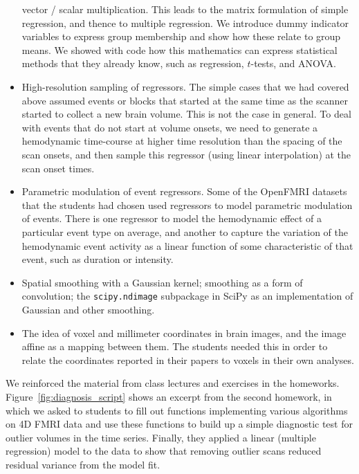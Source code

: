 \begin{itemize}
        vector / scalar multiplication.  This leads to the matrix formulation
        of simple regression, and thence to multiple regression.  We introduce
        dummy indicator variables to express group membership and show how
        these relate to group means.  We showed with code how this mathematics
        can express statistical methods that they already know, such as
        regression, $t$-tests, and ANOVA.
\item
    High-resolution sampling of regressors.  The simple cases that we had
        covered above assumed events or blocks that started at the same time
        as the scanner started to collect a new brain volume.  This is not the
        case in general.  To deal with events that do not start at volume
        onsets, we need to generate a hemodynamic time-course at higher
        time resolution than the spacing of the scan onsets, and then sample
        this regressor (using linear interpolation) at the scan onset times.
\item
    Parametric modulation of event regressors.  Some of the OpenFMRI datasets
        that the students had chosen used regressors to model parametric
        modulation of events.  There is one regressor to model the hemodynamic
        effect of a particular event type on average, and another to capture
        the variation of the hemodynamic event activity as a linear function
        of some characteristic of that event, such as duration or intensity.
\item
    Spatial smoothing with a Gaussian kernel; smoothing as a form of
    convolution; the \texttt{scipy.ndimage} subpackage in SciPy as an
    implementation of Gaussian and other smoothing.

\item
    The idea of voxel and millimeter coordinates in brain images, and the
    image affine as a mapping between them.  The students needed this in order
    to relate the coordinates reported in their papers to voxels in their own
    analyses.

\end{itemize}

We reinforced the material from class lectures and exercises in the homeworks.
Figure~\ref{fig:diagnosis_script} shows an excerpt from the second homework,
in which we asked to students to fill out functions implementing various
algorithms on 4D FMRI data and use these functions to build up a simple
diagnostic test for outlier volumes in the time series.  Finally, they
applied a linear (multiple regression) model to the data to show that removing
outlier scans reduced residual variance from the model fit.

